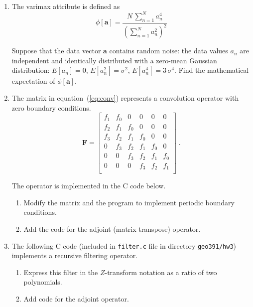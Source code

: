 \begin{enumerate}

\item The varimax attribute is defined as
\begin{equation}
  \label{eq:varimax}
\phi[\mathbf{a}] = \frac{\displaystyle N\,\sum\limits_{n=1}^N
  a_n^4}{\displaystyle \left(\sum\limits_{n=1}^{N} a_n^2\right)^2}
\end{equation}

Suppose that the data vector $\mathbf{a}$ contains random noise:
the data values $a_n$ are independent and identically distributed with
a zero-mean Gaussian distribution: $E[a_n]=0$, $E[a_n^2]=\sigma^2$,
$E[a_n^4]=3\,\sigma^4$. Find the mathematical expectation of
$\phi[\mathbf{a}]$.

\item The matrix in equation~(\ref{eq:conv}) represents a convolution operator with zero boundary conditions.
\begin{equation}
\label{eq:conv}
\mathbf{F} = \left[\begin{array}{llllll}
f_1 & f_0 & 0   & 0   & 0   & 0   \\
f_2 & f_1 & f_0 & 0   & 0   & 0   \\
f_3 & f_2 & f_1 & f_0 & 0   & 0   \\
0   & f_3 & f_2 & f_1 & f_0 & 0   \\
0   & 0   & f_3 & f_2 & f_1 & f_0 \\
0   & 0   & 0   & f_3 & f_2 & f_1 \\
\end{array}\right]\;.
\end{equation}

The operator is implemented in the C code below.

\lstset{language=c,numbers=left,numberstyle=\tiny,showstringspaces=false}


\begin{enumerate}
\item Modify the matrix and the program to implement periodic boundary conditions.
\item Add the code for the adjoint (matrix transpose) operator.
\end{enumerate}

\item The following C code (included in \texttt{filter.c} file in
  directory \texttt{geo391/hw3}) implements a recursive filtering
  operator.

\lstset{language=c,numbers=left,numberstyle=\tiny,showstringspaces=false}


\begin{enumerate}
\item Express this filter in the $Z$-transform notation as a ratio
  of two polynomials.
\item Add code for the adjoint operator.
\end{enumerate}

\end{enumerate}

